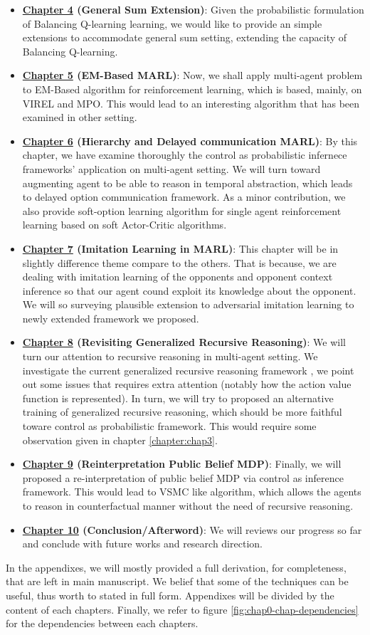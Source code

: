\begin{itemize}
    \item \textbf{\hyperref[chapter:chap4]{Chapter 4} (General Sum Extension)}: Given the probabilistic formulation of Balancing Q-learning learning, we would like to provide an simple extensions to accommodate general sum setting, extending the capacity of Balancing Q-learning.
    \item \textbf{\hyperref[chapter:chap5]{Chapter 5} (EM-Based MARL)}: Now, we shall apply multi-agent problem to EM-Based algorithm for reinforcement learning, which is based, mainly, on VIREL and MPO. This would lead to an interesting algorithm that has been examined in other setting. 
    \item \textbf{\hyperref[chapter:chap6]{Chapter 6} (Hierarchy and Delayed communication MARL)}: By this chapter, we have examine thoroughly the control as probabilistic infernece frameworks' application on multi-agent setting. We will turn toward augmenting agent to be able to reason in temporal abstraction, which leads to delayed option communication framework. As a minor contribution, we also provide soft-option learning algorithm for single agent reinforcement learning based on soft Actor-Critic algorithms.
    \item \textbf{\hyperref[chapter:chap7]{Chapter 7} (Imitation Learning in MARL)}: This chapter will be in slightly difference theme compare to the others. That is because, we are dealing with imitation learning of the opponents and opponent context inference so that our agent cound exploit its knowledge about the opponent. We will so surveying plausible extension to adversarial imitation learning to newly extended framework we proposed. 
    \item \textbf{\hyperref[chapter:chap8]{Chapter 8} (Revisiting Generalized Recursive Reasoning)}: We will turn our attention to recursive reasoning in multi-agent setting. We investigate the current generalized recursive reasoning framework \cite{wen2019multi}, we point out some issues that requires extra attention (notably how the action value function is represented). In turn, we will try to proposed an alternative training of generalized recursive reasoning, which should be more faithful toware control as probabilistic framework. This would require some observation given in chapter \ref{chapter:chap3}. 
    \item \textbf{\hyperref[chapter:chap9]{Chapter 9} (Reinterpretation Public Belief MDP)}: Finally, we will proposed a re-interpretation of public belief MDP via control as inference framework. This would lead to VSMC like algorithm, which allows the agents to reason in counterfactual manner without the need of recursive reasoning.
    \item \textbf{\hyperref[chapter:chap10]{Chapter 10} (Conclusion/Afterword)}: We will reviews our progress so far and conclude with future works and  research direction. 
\end{itemize}
In the appendixes, we will mostly provided a full derivation, for completeness, that are left in main manuscript. We belief that some of the techniques can be useful, thus worth to stated in full form. Appendixes will be divided by the content of each chapters. Finally, we refer to figure \ref{fig:chap0-chap-dependencies} for the dependencies between each chapters.